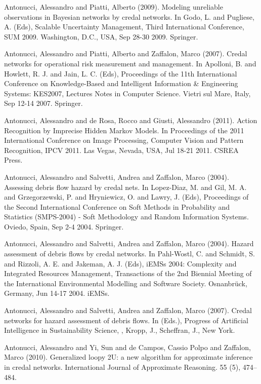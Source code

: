 \begin{cventries}
\begin{cvitems}
\item Antonucci, Alessandro and Piatti, Alberto (2009).   Modeling unreliable observations in Bayesian networks by credal networks.   In Godo, L. and Pugliese, A. (Eds), Scalable Uncertainty Management, Third International Conference, SUM 2009.   Washington, D.C., USA,   Sep 28-30 2009.   Springer.
\item Antonucci, Alessandro and Piatti, Alberto and Zaffalon, Marco (2007).   Credal networks for operational risk measurement and management.   In Apolloni, B. and Howlett, R. J. and Jain, L. C. (Eds), Proceedings of the 11th International Conference on Knowledge-Based and Intelligent Information \& Engineering Systems: KES2007, Lectures Notes in Computer Science.   Vietri sul Mare, Italy,   Sep 12-14 2007.   Springer.
\item Antonucci, Alessandro and de Rosa, Rocco and Giusti, Alessandro (2011).   Action Recognition by Imprecise Hidden Markov Models.   In Proceedings of the 2011 International Conference on Image Processing, Computer Vision and Pattern Recognition, IPCV 2011.   Las Vegas, Nevada, USA,   Jul 18-21 2011.   CSREA Press.
\item Antonucci, Alessandro and Salvetti, Andrea and Zaffalon, Marco (2004).   Assessing debris flow hazard by credal nets.   In Lopez-Diaz, M. and Gil, M. A. and Grzegorzewski, P. and Hryniewicz, O. and Lawry, J. (Eds), Proceedings of the Second International Conference on Soft Methods in Probability and Statistics (SMPS-2004) - Soft Methodology and Random Information Systems.   Oviedo, Spain,   Sep 2-4 2004.   Springer.
\item Antonucci, Alessandro and Salvetti, Andrea and Zaffalon, Marco (2004).   Hazard assessment of debris flows by credal networks.   In Pahl-Wostl, C. and Schmidt, S. and Rizzoli, A. E. and Jakeman, A. J. (Eds), iEMSs 2004: Complexity and Integrated Resources Management, Transactions of the 2nd Biennial Meeting of the International Environmental Modelling and Software Society.   Osnanbrück, Germany,   Jun 14-17 2004.   iEMSs.
\item Antonucci, Alessandro and Salvetti, Andrea and Zaffalon, Marco (2007).   Credal networks for hazard assessment of debris flows.   In (Eds.), Progress of Artificial Intelligence in Sustainability Science, , Kropp, J., Scheffran, J., New York.
\item Antonucci, Alessandro and Yi, Sun and de Campos, Cassio Polpo and Zaffalon, Marco (2010).   Generalized loopy 2U: a new algorithm for approximate inference in credal networks.   International Journal of Approximate Reasoning. 55 (5), 474–484.

\end{cvitems}
\end{cventries}
